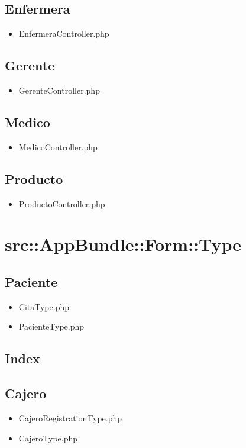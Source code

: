		\subsection{Enfermera}
		\begin{itemize}
		\item EnfermeraController.php
		\end{itemize}
		\subsection{Gerente}
		\begin{itemize}
		\item GerenteController.php
		\end{itemize}
		\subsection{Medico}
		\begin{itemize}
		\item MedicoController.php
		\end{itemize}
		\subsection{Producto}
		\begin{itemize}
		\item ProductoController.php
		\end{itemize}
	\section{src::AppBundle::Form::Type}
		\subsection{Paciente}
		\begin{itemize}
		\item CitaType.php
		\item PacienteType.php
		\end{itemize}
		\subsection{Index}
		\subsection{Cajero}
		\begin{itemize}
		\item CajeroRegistrationType.php
		\item CajeroType.php
		\end{itemize}
